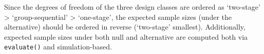 \documentclass[
]{book}
\newenvironment{Shaded}{\begin{snugshade}}{\end{snugshade}}
\newcommand{\CommentTok}[1]{\textcolor[rgb]{0.56,0.35,0.01}{\textit{#1}}}
\newcommand{\DecValTok}[1]{\textcolor[rgb]{0.00,0.00,0.81}{#1}}
\newcommand{\FunctionTok}[1]{\textcolor[rgb]{0.00,0.00,0.00}{#1}}
\newcommand{\NormalTok}[1]{#1}
\newcommand{\SpecialCharTok}[1]{\textcolor[rgb]{0.00,0.00,0.00}{#1}}
\newcommand{\StringTok}[1]{\textcolor[rgb]{0.31,0.60,0.02}{#1}}
\begin{document}
\begin{Shaded}
\end{Shaded}

Since the degrees of freedom of the three design classes are ordered as
`two-stage' \textgreater{} `group-sequential' \textgreater{} `one-stage',
the expected sample sizes (under the alternative) should be ordered
in reverse (`two-stage' smallest).
Additionally, expected sample sizes under both null and alternative
are computed both via \texttt{evaluate()} and simulation-based.
\end{document}
